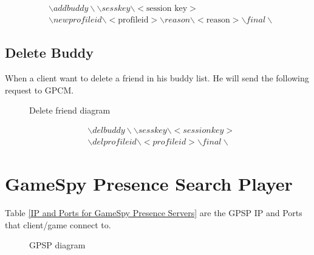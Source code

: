 \documentclass[oneside,titlepage,a4paper]{Definition/retrospy} %
\begin{document}
\begin{tcolorbox}
	\begin{equation}
	\begin{split}
	&\backslash addbuddy \backslash \backslash sesskey \backslash <\text{session key}> \\
	&\backslash newprofileid \backslash <\text{profileid}> \backslash reason \backslash <\text{reason}> \backslash final \backslash
	\end{split}
	\end{equation}
\end{tcolorbox}

\subsection{Delete Buddy}
When a client want to delete a friend in his buddy list. He will send the following request to GPCM.
\begin{figure}[H]
	\centering
	\caption{Delete friend diagram}
	\label{Delete friend diagram}
\end{figure}

\begin{tcolorbox}
	\begin{equation}
	\begin{split}
	&\backslash delbuddy \backslash \backslash sesskey \backslash <session key> \\
	&\backslash delprofileid \backslash <profileid> \backslash final \backslash
	\end{split}
	\end{equation}
\end{tcolorbox}
\section{GameSpy Presence Search Player}
Table \ref{IP and Ports for GameSpy Presence Servers} are the GPSP IP and Ports that client/game connect to.

\begin{figure}[H]
	\centering
	\caption{GPSP diagram}
	\label{GPSP diagram}
\end{figure}
\end{document}
